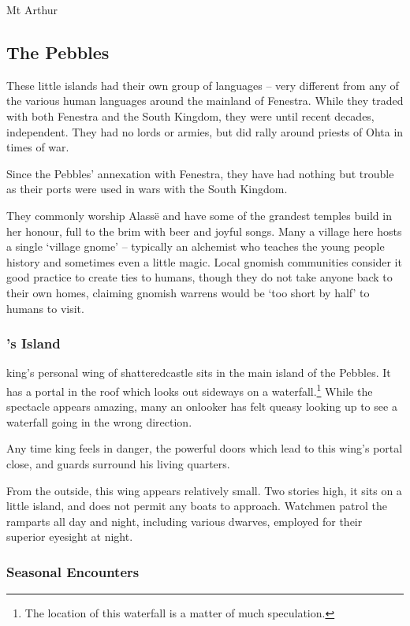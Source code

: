 \begin{multicols}{2}
\begin{encounters}{Mt Arthur}
\end{encounters}

\subsection{The Pebbles}

These little islands had their own group of languages -- very different from any of the various human languages around the mainland of Fenestra.  While they traded with both Fenestra and the South Kingdom, they were until recent decades, independent.  They had no lords or armies, but did rally around priests of Ohta in times of war.

Since the Pebbles' annexation with Fenestra, they have had nothing but trouble as their ports were used in wars with the South Kingdom.

They commonly worship Alass\"{e} and have some of the grandest temples build in her honour, full to the brim with beer and joyful songs.
Many a village here hosts a single `village gnome' -- typically an alchemist who teaches the young people history and sometimes even a little magic.
Local gnomish communities consider it good practice to create ties to humans, though they do not take anyone back to their own homes, claiming gnomish warrens would be `too short by half' to humans to visit.

\subsubsection{'s Island}

\Gls{king}'s personal wing of \gls{shatteredcastle} sits in the main island of the Pebbles.
It has a portal in the roof which looks out sideways on a waterfall.\footnote{The location of this waterfall is a matter of much speculation.}
While the spectacle appears amazing, many an onlooker has felt queasy looking up to see a waterfall going in the wrong direction.

Any time \gls{king} feels in danger, the powerful doors which lead to this wing's portal close, and guards surround his living quarters.

From the outside, this wing appears relatively small.
Two stories high, it sits on a little island, and does not permit any boats to approach.
Watchmen patrol the ramparts all day and night, including various dwarves, employed for their superior eyesight at night.

\subsubsection{Seasonal Encounters}


\end{multicols}
